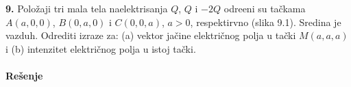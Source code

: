 \textbf{\Large 9.} Polo\v{z}aji tri mala tela naelektrisanja $Q$, $Q$ i $-2Q$ odre\dj{}eni su ta\v{c}kama $A(a,0,0)$, $B(0, a, 0)$ i $C(0, 0, a)$, $a > 0$, respektirvno (slika 9.1). Sredina je vazduh. Odrediti izraze za: (a) vektor ja\v{c}ine elektri\v{c}nog polja u ta\v{c}ki $M(a, a, a)$ i (b) intenzitet elektri\v{c}nog polja u istoj ta\v{c}ki.
\\\\
\textbf{\Large Re\v{s}enje}
